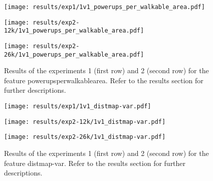  
\begin{figure}[h!]
    \centering
	\begin{minipage}{0.3\linewidth}
		\texttt{[image: results/exp1/1v1\_powerups\_per\_walkable\_area.pdf]}
	\end{minipage}

	\begin{minipage}{0.3\linewidth}
		\texttt{[image: results/exp2-12k/1v1\_powerups\_per\_walkable\_area.pdf]}
	\end{minipage}
	\begin{minipage}{0.3\linewidth}
		\texttt{[image: results/exp2-26k/1v1\_powerups\_per\_walkable\_area.pdf]}
	\end{minipage}

	\caption[ Results: Feature powerups\textunderscore per\textunderscore walkable\textunderscore area]{ Results of the experiments 1 (first row) and 2 (second row) for the feature powerups\textunderscore per\textunderscore walkable\textunderscore area. Refer to the results section for further descriptions. }
	\label{fig:appendix_powerups_per_walkable_area}
\end{figure}
 
\begin{figure}[h!]
    \centering
	\begin{minipage}{0.3\linewidth}
		\texttt{[image: results/exp1/1v1\_distmap-var.pdf]}
	\end{minipage}

	\begin{minipage}{0.3\linewidth}
		\texttt{[image: results/exp2-12k/1v1\_distmap-var.pdf]}
	\end{minipage}
	\begin{minipage}{0.3\linewidth}
		\texttt{[image: results/exp2-26k/1v1\_distmap-var.pdf]}
	\end{minipage}

	\caption[ Results: Feature distmap-var]{ Results of the experiments 1 (first row) and 2 (second row) for the feature distmap-var. Refer to the results section for further descriptions. }
	\label{fig:appendix_distmap-var}
\end{figure}
 \newpage 

